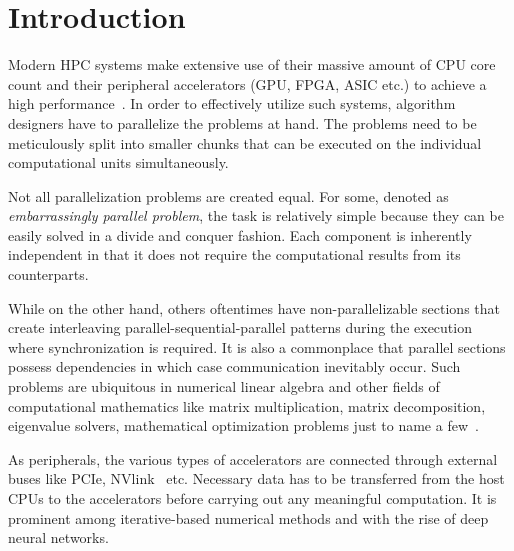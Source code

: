 \chapter{Introduction}
\label{chap:introduction}
Modern HPC systems make extensive use of their massive amount of CPU core count 
and their peripheral accelerators (GPU, FPGA, ASIC etc.) to achieve a high 
performance~\cite{gropp10, sierra, titan, mn4}.  In order to effectively utilize 
such systems, algorithm designers have to parallelize the problems at hand. The 
problems need to be meticulously split into smaller chunks that can be executed 
on the individual computational units simultaneously. 

Not all parallelization problems are created equal. For some, denoted as 
\textit{embarrassingly parallel problem}, the task is relatively simple because 
they can be easily solved in a divide and conquer fashion. Each component is 
inherently independent in that it does not require the computational results 
from its counterparts.  

While on the other hand, others oftentimes have non-parallelizable sections that 
create interleaving parallel-sequential-parallel patterns during the execution 
where synchronization is required. It is also a commonplace that parallel 
sections possess dependencies in which case communication inevitably occur.
Such problems are ubiquitous in numerical linear algebra and other fields of 
computational mathematics like matrix multiplication, matrix decomposition, 
eigenvalue solvers, mathematical optimization problems just to name a 
few~\cite{communication0, communication1, communication2, communication3}.

As peripherals, the various types of accelerators are connected through external 
buses like PCIe, NVlink~\cite{nvlink} etc. Necessary data has to be transferred 
from the host CPUs to the accelerators before carrying out any meaningful 
computation. It is prominent among iterative-based numerical methods and with 
the rise of deep neural networks.

